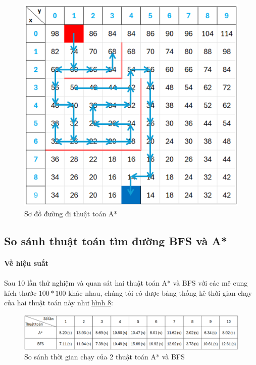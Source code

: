\begin{figure}[H]
    \centering
    \includegraphics[width=0.5\linewidth]{img/astar_pic4.png}
    \caption{Sơ đồ đường đi thuật toán A*}
    \label{fig:astar_pic4}
\end{figure}


\subsection{So sánh thuật toán tìm đường BFS và A*}

\paragraph{Về hiệu suất}

\paragraph{}{Sau 10 lần thử nghiệm và quan sát hai thuật toán A* và BFS với các mê cung kích thước $100 * 100$ khác nhau, chúng tôi có được bảng thống kê thời gian chạy của hai thuật toán này như \hyperref[fig:compare_astar_bfs]{hình 8}:}

\begin{figure}[H]
    \centering
    \includegraphics[width=1\linewidth]{img/compare_astar_bfs.png}
    \caption{So sánh thời gian chạy của 2 thuật toán A* và BFS}
    \label{fig:compare_astar_bfs}
\end{figure}

